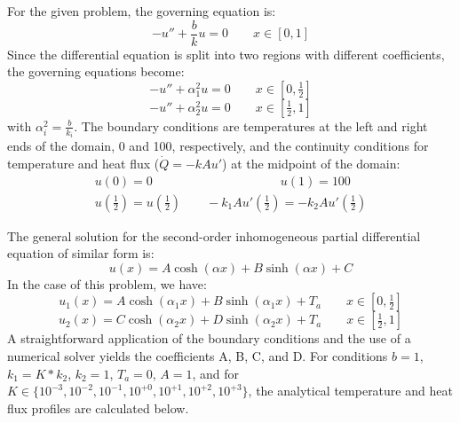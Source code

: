 \documentclass[10pt]{article}
\begin{document}
For the given problem, the governing equation is:
\begin{equation}
-u'' + \frac{b}{k}u = 0 \qquad x \in [0, 1]
\end{equation}
Since the differential equation is split into two regions with different coefficients, the governing equations become:
\begin{equation}
-u'' + \alpha_1^2u = 0 \qquad x \in [0, \tfrac{1}{2}]
\end{equation}
\begin{equation}
-u'' + \alpha_2^2u = 0 \qquad x \in [\tfrac{1}{2}, 1]
\end{equation}
with $\alpha_i^2 = \frac{b}{k_i}$.
The boundary conditions are temperatures at the left and right ends of the domain, 0 and 100, respectively, and the continuity conditions for temperature and heat flux ($\dot{Q}=-kAu'$) at the midpoint of the domain:
\begin{equation}
\begin{split}
u(0) = 0  \qquad \qquad \qquad \qquad \qquad  \; u(1) = 100 \\
u(\tfrac{1}{2}) = u(\tfrac{1}{2}) \qquad -k_1Au'(\tfrac{1}{2}) = -k_2Au'(\tfrac{1}{2})
\end{split}
\end{equation}

The general solution for the second-order inhomogeneous partial differential equation of similar form is:
\begin{equation}
u(x) = A\cosh(\alpha x) + B\sinh(\alpha x) + C
\end{equation}
In the case of this problem, we have:
\begin{equation}
u_1(x) = A\cosh(\alpha_1 x) + B\sinh(\alpha_1 x) + T_a \qquad x \in [0, \tfrac{1}{2}]
\end{equation}
\begin{equation}
u_2(x) = C\cosh(\alpha_2 x) + D\sinh(\alpha_2 x) + T_a \qquad x \in [\tfrac{1}{2}, 1]
\end{equation}
A straightforward application of the boundary conditions and the use of a numerical solver yields the coefficients A, B, C, and D. For conditions $b=1$, $k_1=K*k_2$, $k_2=1$, $T_a=0$, $A=1$, and for $K \in \{10^{-3}, 10^{-2}, 10^{-1}, 10^{+0}, 10^{+1}, 10^{+2}, 10^{+3}\}$, the analytical temperature and heat flux profiles are calculated below.

\vfill
\end{document}
